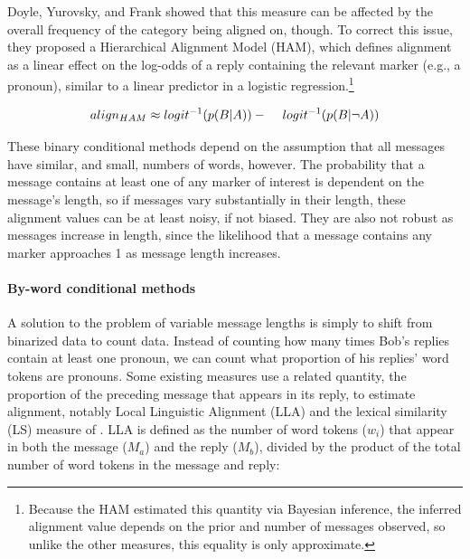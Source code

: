 \documentclass[11pt]{article}
\begin{document}
Doyle, Yurovsky, and Frank  showed that this measure can be affected by the overall frequency of the category being aligned on, though. To correct this issue, they proposed a Hierarchical Alignment Model (HAM), which defines alignment as a linear effect on the log-odds of a reply containing the relevant marker (e.g., a pronoun), similar to a linear predictor in a logistic regression.\footnote{Because the HAM estimated this quantity via Bayesian inference, the inferred alignment value depends on the prior and number of messages observed, so unlike the other measures, this equality is only approximate.}\vspace*{-5pt}

\begin{dmath}
align_{HAM} \approx logit^{-1}(p(B|A)) - \\ \hspace*{1.2em} logit^{-1}(p(B|\neg A))
\end{dmath}

These binary conditional methods depend on the assumption that all messages have similar, and small, numbers of words, however. The probability that a message contains at least one of any marker of interest is dependent on the message's length, so if messages vary substantially in their length, these alignment values can be at least noisy, if not biased. They are also not robust as messages increase in length, since the likelihood that a message contains any marker approaches 1 as message length increases.

\paragraph{By-word conditional methods} A solution to the problem of variable message lengths is simply to shift from binarized data to count data. Instead of counting how many times Bob's replies contain at least one pronoun, we can count what proportion of his replies' word tokens are pronouns.  Some existing measures use a related quantity, the proportion of the preceding message that appears in its reply, to estimate alignment, notably Local Linguistic Alignment (LLA) \cite{FusaroliEtAl2012,WangReitterYen2014} and the lexical similarity (LS) measure of \cite{HealeyPurverHowes2014}. LLA is defined as the number of word tokens ($w_i$) that appear in both the message ($M_a$) and the reply ($M_b$), divided by the product of the total number of word tokens in the message and reply:\vspace*{-5pt}
\end{document}
